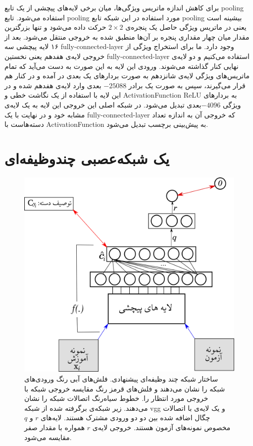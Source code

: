  برای کاهش اندازه ماتریس ویژگی‌ها، میان برخی لایه‌های پیچشی از یک تابع \gls{pooling} استفاده می‌شود. تابع \gls{pooling} مورد استفاده در این شبکه تابع \gls{pooling} بیشینه است یعنی در ماتریس ویژگی‌ حاصل یک پنجره‌ی $2 \times 2$ حرکت داده می‌شود و تنها بزرگترین مقدار میان چهار مقداری پنجره بر آن‌ها منطبق شده به خروجی منتقل می‌شود. بعد از ۱۶ لایه پیچشی سه \gls{fully-connected-layer} وجود دارد. ما برای استخراج ویژگی از خروجی لایه‌ی هفدهم یعنی نخستین  \gls{fully-connected-layer} استفاده می‌کنیم و دو لایه‌ی نهایی کنار گذاشته می‌شوند. ورودی این لایه به این صورت به دست می‌آید که تمام ماتریس‌های ویژگی لایه‌ی شانزدهم به صورت بردارهای یک بعدی در آمده و در کنار هم قرار می‌گیرند، سپس به صورت یک برادر $-25088$ بعدی وارد لایه‌ی هفدهم شده و در این لایه با استفاده از یک نگاشت خطی و \gls{ActivationFunction}   \gls{ReLU} به بردارهای ویژگی $-4096$بعدی تبدیل می‌شود. در شبکه اصلی این خروجی این لایه به یک لایه‌ی مشابه خود و در نهایت با یک  \gls{fully-connected-layer} که خروجی آن به اندازه تعداد دسته‌هاست با  \gls{ActivationFunction}
 به پیش‌بینی برچسب تبدیل می‌شود.

\section{یک شبکه‌عصبی چندوظیفه‌ای}\label{nn}
\begin{figure}[!t]
\centering
\includegraphics[width=0.85\linewidth]{images/net}
\caption[شبکه‌ی چندوظیفه‌ای پیشنهادی]{
ساختار شبکه چند وظیفه‌ای پیشنهادی. فلش‌های آبی رنگ ورودی‌های شبکه را نشان می‌دهند و فلش‌های قرمز رنگ مقایسه خروجی شبکه با خروجی مورد انتظار را. خطوط سیاه‌رنگ اتصالات شبکه‌ را نشان می‌دهند. زیر شبکه‌ی برگرفته شده از شبکه vgg و یک لایه‌ی با اتصالات چگال اضافه شده بین دو دو ورودی مشترک هستند. لایه‌های $r$ و $q$ مخصوص نمونه‌های آزمون هستند. خروجی لایه‌ی $r$ همواره با مقدار صفر مقایسه می‌شود.
}
\label{fig:nn2}
\end{figure}

